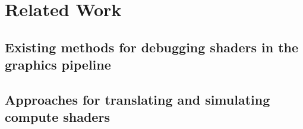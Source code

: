
\chapter{Related Work}\label{cha:RelatedWork}
\section{Existing methods for debugging shaders in the graphics pipeline}
\label{section:debuggingMethods}

\section{Approaches for translating and simulating compute shaders}
\label{section:computeApproaches}